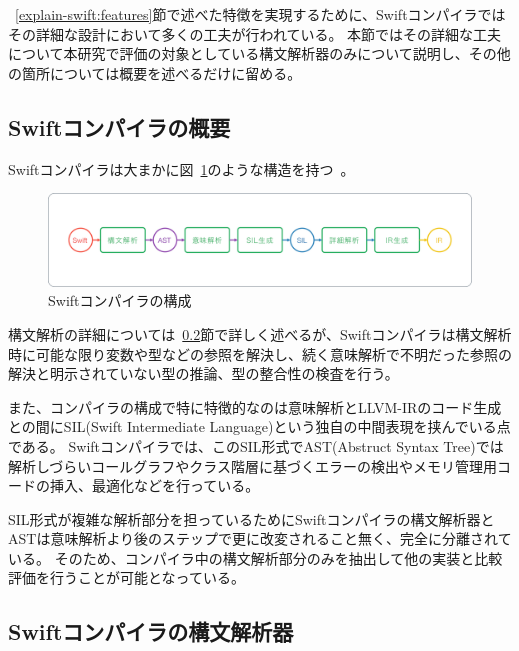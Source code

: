 ~\ref{explain-swift:features}節で述べた特徴を実現するために、Swiftコンパイラではその詳細な設計において多くの工夫が行われている。
本節ではその詳細な工夫について本研究で評価の対象としている構文解析器のみについて説明し、その他の箇所については概要を述べるだけに留める。

\subsection{Swiftコンパイラの概要}

Swiftコンパイラは大まかに図~\ref{img:swift-compile-process}のような構造を持つ~\cite{sil}。

\begin{figure}
    \begin{center}
        \includegraphics[scale=0.30]{./img/swift_compile_process}
        \caption{Swiftコンパイラの構成}
        \label{img:swift-compile-process}
    \end{center}
\end{figure}

構文解析の詳細については~\ref{explain-swift:structure:parser}節で詳しく述べるが、Swiftコンパイラは構文解析時に可能な限り変数や型などの参照を解決し、続く意味解析で不明だった参照の解決と明示されていない型の推論、型の整合性の検査を行う。

また、コンパイラの構成で特に特徴的なのは意味解析とLLVM-IRのコード生成との間にSIL(Swift Intermediate Language)という独自の中間表現を挟んでいる点である。
Swiftコンパイラでは、このSIL形式でAST(Abstruct Syntax Tree)では解析しづらいコールグラフやクラス階層に基づくエラーの検出やメモリ管理用コードの挿入、最適化などを行っている。

SIL形式が複雑な解析部分を担っているためにSwiftコンパイラの構文解析器とASTは意味解析より後のステップで更に改変されること無く、完全に分離されている。
そのため、コンパイラ中の構文解析部分のみを抽出して他の実装と比較評価を行うことが可能となっている。


\subsection{Swiftコンパイラの構文解析器}
\label{explain-swift:structure:parser}

